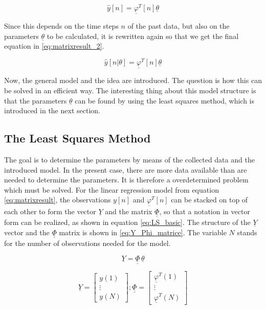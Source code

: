  \begin{equation}
			\hat{y}[n] = \underline{\varphi}^T[n] \underline{\theta}		
	\label{eq:matrixresult}
\end{equation}

Since this depends on the time steps $n$ of the past data, but also on the parameters $\underline{\theta}$ to be calculated, it is rewritten again so that we get the final equation in \ref{eq:matrixresult_2}.

 \begin{equation}
			\hat{y}[n|\theta] = \underline{\varphi}^T[n] \underline{\theta}		
	\label{eq:matrixresult_2}
\end{equation}

Now, the general model and the idea are introduced. The question is how this can be solved in an efficient way. The interesting thing about this model structure is that the parameters $\underline{\theta}$ can be found by using the least squares method, which is introduced in the next section.

\subsection{The Least Squares Method}
\label{sec:lestsquaremethod}

The goal is to determine the parameters by means of the collected data and the introduced model. In the present case, there are more data available than are needed to determine the parameters. It is therefore a overdetermined problem which must be solved. For the linear regression model from equation \ref{eq:matrixresult}, the observations $y[n]$ and $\underline{\varphi}^T[n]$ can be stacked on top of each other to form the vector $\underline{Y}$ and the matrix $\underline{\underline{\Phi}}$, so that a notation in vector form can be realized, as shown in equation \ref{eq:LS_basic}. The structure of the $\underline{Y}$ vector and the $\underline{\underline{\Phi}}$ matrix is shown in \ref{eq:Y_Phi_matrice}. The variable $N$ stands for the number of observations needed for the model.

 \begin{equation}
			\underline{Y} = \underline{\underline{\Phi}} \, \underline{\theta}		
	\label{eq:LS_basic}
\end{equation}

 \begin{equation}
			\underline{Y} =  \begin{bmatrix}
		y(1)\\
		\vdots \\
		y(N)
				\end{bmatrix}	; 
							\underline{\underline{\Phi}} =  \begin{bmatrix}
		\underline{\varphi}^T(1)\\
		\vdots \\
		\underline{\varphi}^T(N)
				\end{bmatrix}	
	\label{eq:Y_Phi_matrice}
\end{equation}

